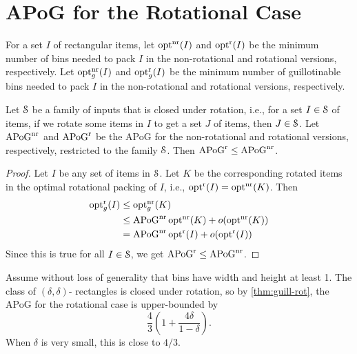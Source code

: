 \section{APoG for the Rotational Case}
\label{sec:guill-rot}

\begin{theorem}
\label{thm:guill-rot}
For a set $I$ of rectangular items,
let $\operatorname{opt}^{\mathrm{nr}}(I)$ and $\operatorname{opt}^{\mathrm{r}}(I)$ be the minimum number of bins
needed to pack $I$ in the non-rotational and rotational versions, respectively.
Let $\operatorname{opt}^{\mathrm{nr}}_g(I)$ and $\operatorname{opt}^{\mathrm{r}}_g(I)$ be the minimum number of guillotinable bins
needed to pack $I$ in the non-rotational and rotational versions, respectively.

Let $\mathcal{S}$ be a family of inputs that is closed under rotation, i.e.,
for a set $I \in \mathcal{S}$ of items, if we rotate some items in $I$ to get a set $J$ of items,
then $J \in \mathcal{S}$.
Let $\mathrm{APoG}^{\mathrm{nr}}$ and $\mathrm{APoG}^{\mathrm{r}}$ be the APoG for the non-rotational
and rotational versions, respectively, restricted to the family $\mathcal{S}$.
Then $\mathrm{APoG}^{\mathrm{r}} \le \mathrm{APoG}^{\mathrm{nr}}$.
\end{theorem}
\begin{proof}
Let $I$ be any set of items in $\mathcal{S}$. Let $K$ be the corresponding rotated items
in the optimal rotational packing of $I$, i.e., $\operatorname{opt}^{\mathrm{r}}(I) = \operatorname{opt}^{\mathrm{nr}}(K)$. Then
\begin{align*}
\operatorname{opt}^{\mathrm{r}}_g(I) &\le \operatorname{opt}^{\mathrm{nr}}_g(K)
\\ &\le \mathrm{APoG}^{\mathrm{nr}}\operatorname{opt}^{\mathrm{nr}}(K) + o(\operatorname{opt}^{\mathrm{nr}}(K))
\\ &= \mathrm{APoG}^{\mathrm{nr}}\operatorname{opt}^{\mathrm{r}}(I) + o(\operatorname{opt}^{\mathrm{r}}(I))
\end{align*}
Since this is true for all $I \in \mathcal{S}$, we get $\mathrm{APoG}^{\mathrm{r}} \le \mathrm{APoG}^{\mathrm{nr}}$.
\end{proof}

Assume without loss of generality that bins have width and height at least 1.
The class of $(\delta, \delta)$-\thin{} rectangles is closed under rotation,
so by \cref{thm:guill-rot}, the APoG for the rotational case is upper-bounded by
\[ \frac{4}{3}\left(1+\frac{4\delta}{1-\delta}\right). \]
When $\delta$ is very small, this is close to $4/3$.
